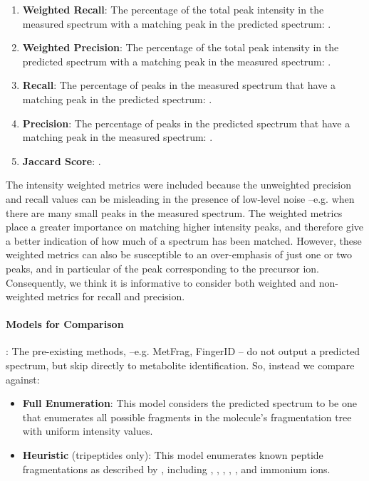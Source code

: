 \begin{enumerate}
\item \textbf{Weighted Recall}: The percentage of the total peak intensity in the measured spectrum with a matching peak in the predicted spectrum:
	.
\item \textbf{Weighted Precision}: The percentage of the total peak intensity in the predicted spectrum with a matching peak in the measured spectrum:
	.
	\item \textbf{Recall}: The percentage of peaks in the measured spectrum that have a matching peak in the predicted spectrum: 
	.
\item \textbf{Precision}: The percentage of peaks in the predicted spectrum that have a matching peak in the measured spectrum: 
	.	
\item \textbf{Jaccard Score}:	
	.
\end{enumerate} 

The intensity weighted metrics were included because the unweighted precision and recall values can be misleading in the presence of low-level noise --e.g. when there are many small peaks in the measured spectrum. The weighted metrics place a greater importance on matching higher intensity peaks, and therefore give a better indication of how much of a spectrum has been matched. However, these weighted metrics can also be susceptible to an over-emphasis of just one or two peaks, and in particular of the peak corresponding to the precursor ion. Consequently, we think it is informative to consider both weighted and non-weighted metrics for recall and precision.

\paragraph{Models for Comparison}:
The pre-existing methods, --e.g. MetFrag, FingerID -- do not output a predicted spectrum, but skip directly to metabolite identification. 
So, instead we compare against:
\begin{itemize}
\item \textbf{Full Enumeration}: This model considers the predicted spectrum to be one that enumerates all possible fragments in the molecule's fragmentation tree with uniform intensity values. 
\item \textbf{Heuristic} (tripeptides only): This model enumerates known peptide fragmentations as described by \citep{Papayannopoulos1995}, including , , , , ,  and immonium ions.
\end{itemize}

